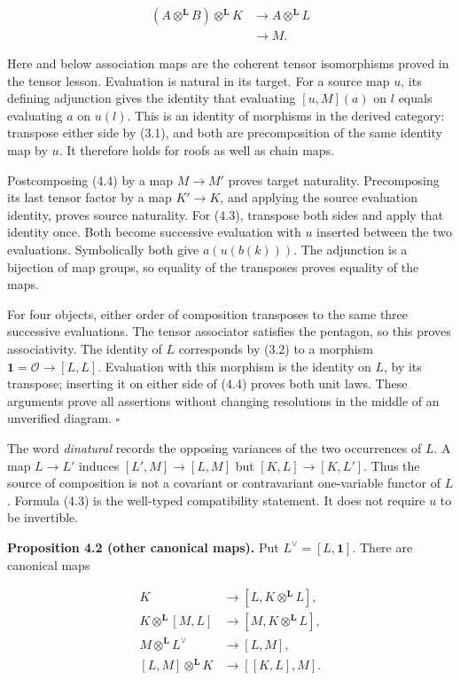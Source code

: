 \documentclass[
  english,
  11pt,
  a4paper,
]{article}
\begin{document}
\[\begin{aligned}
(A\otimes^{\mathbf L}B)\otimes^{\mathbf L}K
&\longrightarrow A\otimes^{\mathbf L}L\\
&\longrightarrow M.
\end{aligned}
\tag{4.4}\]

Here and below association maps are the coherent tensor isomorphisms
proved in the tensor lesson. Evaluation is natural in its target. For a
source map \(u\), its defining adjunction gives the identity that
evaluating \([u,M](a)\) on \(l\) equals evaluating \(a\) on \(u(l)\).
This is an identity of morphisms in the derived category: transpose
either side by (3.1), and both are precomposition of the same identity
map by \(u\). It therefore holds for roofs as well as chain maps.

Postcomposing (4.4) by a map \(M\to M'\) proves target naturality.
Precomposing its last tensor factor by a map \(K'\to K\), and applying
the source evaluation identity, proves source naturality. For (4.3),
transpose both sides and apply that identity once. Both become
successive evaluation with \(u\) inserted between the two evaluations.
Symbolically both give \(a(u(b(k)))\). The adjunction is a bijection of
map groups, so equality of the transposes proves equality of the maps.

For four objects, either order of composition transposes to the same
three successive evaluations. The tensor associator satisfies the
pentagon, so this proves associativity. The identity of \(L\)
corresponds by (3.2) to a morphism \(\mathbf1=\mathcal O\to[L,L]\).
Evaluation with this morphism is the identity on \(L\), by its
transpose; inserting it on either side of (4.4) proves both unit laws.
These arguments prove all assertions without changing resolutions in the
middle of an unverified diagram. \(\square\)

The word \emph{dinatural} records the opposing variances of the two
occurrences of \(L\). A map \(L\to L'\) induces \([L',M]\to[L,M]\) but
\([K,L]\to[K,L']\). Thus the source of composition is not a covariant or
contravariant one-variable functor of \(L\). Formula (4.3) is the
well-typed compatibility statement. It does not require \(u\) to be
invertible.

\textbf{Proposition 4.2 (other canonical maps).} Put
\(L^\vee=[L,\mathbf1]\). There are canonical maps

\[\begin{aligned}
K&\longrightarrow[L,K\otimes^{\mathbf L}L],\\
K\otimes^{\mathbf L}[M,L]
&\longrightarrow[M,K\otimes^{\mathbf L}L],\\
M\otimes^{\mathbf L}L^\vee&\longrightarrow[L,M],\\
[L,M]\otimes^{\mathbf L}K&\longrightarrow[[K,L],M].
\end{aligned}
\tag{4.5}\]
\end{document}
